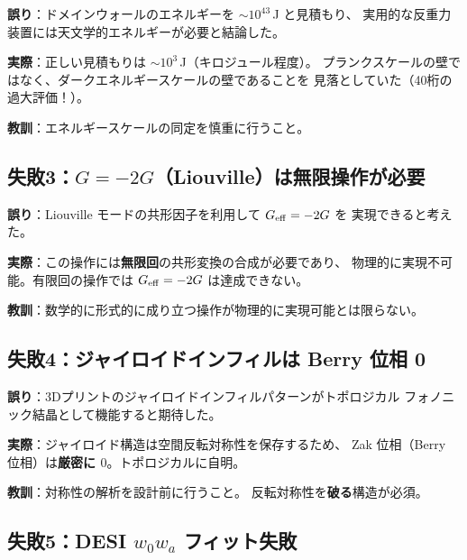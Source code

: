 \begin{warningbox}[失敗2: 壁エネルギーの過大評価]
\textbf{誤り}：ドメインウォールのエネルギーを $\sim 10^{43}$\,J と見積もり、
実用的な反重力装置には天文学的エネルギーが必要と結論した。

\medskip
\textbf{実際}：正しい見積もりは $\sim 10^3$\,J（キロジュール程度）。
プランクスケールの壁ではなく、ダークエネルギースケールの壁であることを
見落としていた（40桁の過大評価！）。

\medskip
\textbf{教訓}：エネルギースケールの同定を慎重に行うこと。
\end{warningbox}

\subsection{失敗3：$G = -2G$（Liouville）は無限操作が必要}

\begin{warningbox}
\textbf{誤り}：Liouville モードの共形因子を利用して $G_{\mathrm{eff}} = -2G$ を
実現できると考えた。

\medskip
\textbf{実際}：この操作には\textbf{無限回}の共形変換の合成が必要であり、
物理的に実現不可能。有限回の操作では $G_{\mathrm{eff}} = -2G$ は達成できない。

\medskip
\textbf{教訓}：数学的に形式的に成り立つ操作が物理的に実現可能とは限らない。
\end{warningbox}

\subsection{失敗4：ジャイロイドインフィルは Berry 位相 0}

\begin{warningbox}[失敗4: ジャイロイド構造]
\textbf{誤り}：3Dプリントのジャイロイドインフィルパターンがトポロジカル
フォノニック結晶として機能すると期待した。

\medskip
\textbf{実際}：ジャイロイド構造は空間反転対称性を保存するため、
Zak 位相（Berry 位相）は\textbf{厳密に $0$}。トポロジカルに自明。

\medskip
\textbf{教訓}：対称性の解析を設計前に行うこと。
反転対称性を\textbf{破る}構造が必須。
\end{warningbox}

\subsection{失敗5：DESI $w_0 w_a$ フィット失敗}

